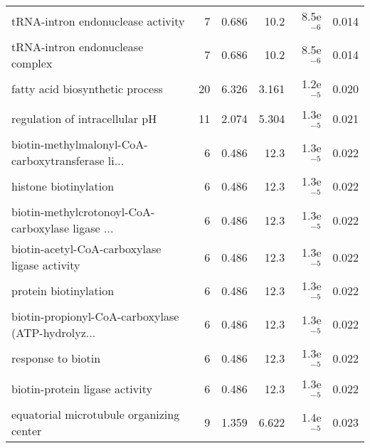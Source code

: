\begin{longtable}{lrrrrr}
                 tRNA-intron endonuclease activity &                       7 &                   0.686 &       10.2 &          8.5e$^{-6}$ &                0.014 \\
                  tRNA-intron endonuclease complex &                       7 &                   0.686 &       10.2 &          8.5e$^{-6}$ &                0.014 \\
                   fatty acid biosynthetic process &                      20 &                   6.326 &      3.161 &          1.2e$^{-5}$ &                0.020 \\
                    regulation of intracellular pH &                      11 &                   2.074 &      5.304 &          1.3e$^{-5}$ &                0.021 \\
 biotin-methylmalonyl-CoA-carboxytransferase li... &                       6 &                   0.486 &       12.3 &          1.3e$^{-5}$ &                0.022 \\
                             histone biotinylation &                       6 &                   0.486 &       12.3 &          1.3e$^{-5}$ &                0.022 \\
 biotin-methylcrotonoyl-CoA-carboxylase ligase ... &                       6 &                   0.486 &       12.3 &          1.3e$^{-5}$ &                0.022 \\
     biotin-acetyl-CoA-carboxylase ligase activity &                       6 &                   0.486 &       12.3 &          1.3e$^{-5}$ &                0.022 \\
                             protein biotinylation &                       6 &                   0.486 &       12.3 &          1.3e$^{-5}$ &                0.022 \\
 biotin-propionyl-CoA-carboxylase (ATP-hydrolyz... &                       6 &                   0.486 &       12.3 &          1.3e$^{-5}$ &                0.022 \\
                                response to biotin &                       6 &                   0.486 &       12.3 &          1.3e$^{-5}$ &                0.022 \\
                    biotin-protein ligase activity &                       6 &                   0.486 &       12.3 &          1.3e$^{-5}$ &                0.022 \\
          equatorial microtubule organizing center &                       9 &                   1.359 &      6.622 &          1.4e$^{-5}$ &                0.023 \\

\end{longtable}
